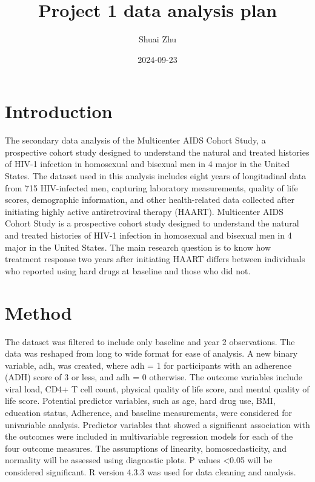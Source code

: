 \documentclass[
  12pt,
]{article}
\title{Project 1 data analysis plan}
\author{Shuai Zhu}
\date{2024-09-23}
\begin{document}
\maketitle

\hypertarget{introduction}{%
\section{Introduction}\label{introduction}}

The secondary data analysis of the Multicenter AIDS Cohort Study, a
prospective cohort study designed to understand the natural and treated
histories of HIV-1 infection in homosexual and bisexual men in 4 major
in the United States. The dataset used in this analysis includes eight
years of longitudinal data from 715 HIV-infected men, capturing
laboratory measurements, quality of life scores, demographic
information, and other health-related data collected after initiating
highly active antiretroviral therapy (HAART). Multicenter AIDS Cohort
Study is a prospective cohort study designed to understand the natural
and treated histories of HIV-1 infection in homosexual and bisexual men
in 4 major in the United States. The main research question is to know
how treatment response two years after initiating HAART differs between
individuals who reported using hard drugs at baseline and those who did
not.

\hypertarget{method}{%
\section{Method}\label{method}}

The dataset was filtered to include only baseline and year 2
observations. The data was reshaped from long to wide format for ease of
analysis. A new binary variable, adh, was created, where adh = 1 for
participants with an adherence (ADH) score of 3 or less, and adh = 0
otherwise. The outcome variables include viral load, CD4+ T cell count,
physical quality of life score, and mental quality of life score.
Potential predictor variables, such as age, hard drug use, BMI,
education status, Adherence, and baseline measurements, were considered
for univariable analysis. Predictor variables that showed a significant
association with the outcomes were included in multivariable regression
models for each of the four outcome measures. The assumptions of
linearity, homoscedasticity, and normality will be assessed using
diagnostic plots. P values \textless0.05 will be considered significant.
R version 4.3.3 was used for data cleaning and analysis.
\end{document}
